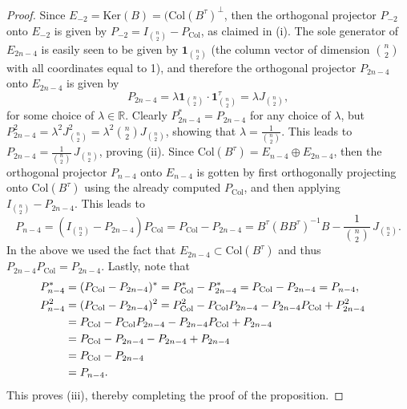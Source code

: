 \documentclass[12pt]{amsart}
\numberwithin{theorem}{section}
\theoremstyle{remark}
\newcommand{\kerr}{\text{Ker}}
\begin{document}
\begin{proof}
Since $E_{-2} = \kerr(B) = (\text{Col}(B^\tau)^\perp$, then the orthogonal projector $P_{-2}$ onto $E_{-2}$ is given by $P_{-2} = I_{n\choose 2} - P_{\text{Col}}$, as claimed in (i).
\vskip3mm 
The sole generator of $E_{2n-4}$ is easily seen to be given by $\mathbf{1}_{n\choose 2}$ (the column vector of dimension ${n\choose 2}$ with all coordinates equal to 1), and therefore the orthogonal projector $P_{2n-4}$ onto $E_{2n-4}$ is given by 
%
$$P_{2n-4} = \lambda \mathbf{1}_{n\choose 2}\cdot \mathbf{1}^\tau_{n\choose 2} = \lambda  J_{n\choose 2},$$
%
for some choice of $\lambda \in \mathbb R$. %
Clearly $P_{2n-4}^\ast = P_{2n-4}$ for any choice of $\lambda$, but $P_{2n-4}^2 = \lambda ^2 J_{n\choose 2}^2 = \lambda^2 {n\choose 2} J_{n\choose 2}$, showing that $\lambda = \frac{1}{{n\choose 2}}$. This leads to $P_{2n-4} = \frac{1}{{n\choose 2}}\, J_{n\choose 2}$, proving (ii). 
\vskip3mm  
Since Col$(B^\tau) = E_{n-4}\oplus E_{2n-4}$, then the orthogonal projector $P_{n-4}$ onto $E_{n-4}$ is gotten by first orthogonally projecting onto Col$(B^\tau)$ using the already computed $P_{\text{Col}}$, and then applying $I_{n\choose 2} - P_{2n-4}$. This leads to
$$P_{n-4} = \left(I_{n\choose 2} - P_{2n-4}\right) P_{\text{Col}} = P_{\text{Col}} - P_{2n-4} = B^\tau(BB^\tau)^{-1}B - \frac{1}{{n\choose 2}}\, J_{n\choose 2}.$$ 
In the above we used the fact that $E_{2n-4}\subset \text{Col}(B^\tau)$ and thus $P_{2n-4}P_{\text{Col}} =P_{2n-4}$. Lastly, note that 
\begin{align*}
P_{n-4}^\ast  & = (P_{\text{Col}} - P_{2n-4})^\ast = P_{\text{Col}}^\ast - P_{2n-4}^\ast = P_{\text{Col}} - P_{2n-4} = P_{n-4}, \cr 
P_{n-4}^2 & = (P_{\text{Col}} - P_{2n-4})^2 = P_{\text{Col}}^2 - P_{\text{Col}} P_{2n-4} - P_{2n-4}P_{\text{Col}} +P_{2n-4}^2 \cr
& = P_{\text{Col}} - P_{\text{Col}} P_{2n-4} - P_{2n-4}P_{\text{Col}} +P_{2n-4} \cr
& = P_{\text{Col}} - P_{2n-4} - P_{2n-4}+P_{2n-4} \cr
& = P_{\text{Col}} - P_{2n-4}\cr
& = P_{n-4}.
\end{align*} 
This proves (iii), thereby completing the proof of the proposition. 
\end{proof}
\end{document}
